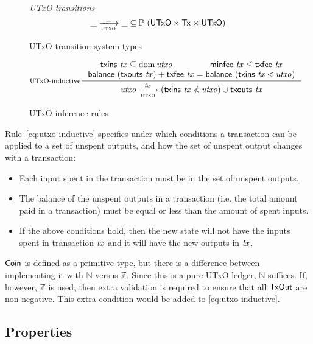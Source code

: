 \documentclass[11pt,a4paper]{article}
\newcommand{\Tx}{\type{Tx}}
\newcommand{\UTxO}{\type{UTxO}}
\newcommand{\Coin}{\type{Coin}}
\newcommand{\TxOut}{\type{TxOut}}
\newcommand{\txins}[1]{\fun{txins}~ \var{#1}}
\newcommand{\txouts}[1]{\fun{txouts}~ \var{#1}}
\newcommand{\balance}[1]{\fun{balance}~ \var{#1}}
\newcommand{\txfee}[1]{\fun{txfee}~ \var{#1}}
\newcommand{\minfee}[1]{\fun{minfee}~ \var{#1}}
\begin{document}
\begin{figure}
  \emph{UTxO transitions}
  \begin{equation*}
    \var{\_} \trans{utxo}{\_} \var{\_}
    \subseteq \powerset (\UTxO \times \Tx \times \UTxO)
  \end{equation*}
  \caption{UTxO transition-system types}
  \label{fig:ts-types:utxo}
\end{figure}

\begin{figure}
  \begin{equation}\label{eq:utxo-inductive}
    \inference[UTxO-inductive]
    { \txins{tx} \subseteq \dom \var{utxo} & \minfee{tx} \leq \txfee{tx}\\
      \balance{(\txouts{tx})}  + \txfee{tx} = \balance{(\txins{tx} \restrictdom \var{utxo})}
    }
    {\var{utxo} \trans{utxo}{tx}
      (\txins{tx} \subtractdom \var{utxo}) \cup \txouts{tx}
    }
  \end{equation}
  \caption{UTxO inference rules}
  \label{fig:rules:utxo}
\end{figure}

Rule~\ref{eq:utxo-inductive} specifies under which conditions a transaction can
be applied to a set of unspent outputs, and how the set of unspent output
changes with a transaction:
\begin{itemize}
\item Each input spent in the transaction must be in the set of unspent
  outputs.
\item The balance of the unspent outputs in a transaction (i.e. the total
  amount paid in a transaction) must be equal or less than the amount of spent
  inputs.
\item If the above conditions hold, then the new state will not have the inputs
  spent in transaction $\mathit{tx}$ and it will have the new outputs in
  $\mathit{tx}$.
\end{itemize}

\begin{note}
  $\Coin$ is defined as a primitive type, but there is a difference
  between implementing it with $\mathbb{N}$ versus $\mathbb{Z}$.
  Since this is a pure UTxO ledger, $\mathbb{N}$ suffices.
  If, however, $\mathbb{Z}$ is used, then extra validation is required
  to ensure that all $\TxOut$ are non-negative.
  This extra condition would be added to \cref{eq:utxo-inductive}.
\end{note}

\subsection{Properties}
\label{sec:utxo-properties}
\end{document}

